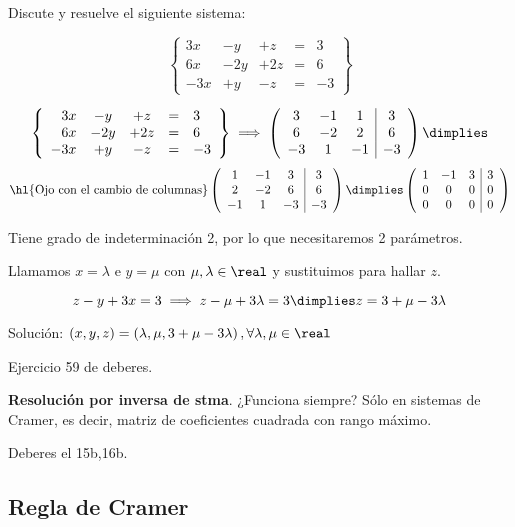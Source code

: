 \begin{problem}

Discute y resuelve el siguiente sistema:

\[
\left\{\begin{array}{rcccl}
3x&-y&+z&=&3\\
6x&-2y&+2z&=&6\\
-3x&+y&-z&=&-3
\end{array}\right\}
\]

\solution


\[
\left\{\begin{array}{rcccl}
3x&-y&+z&=&3\\
6x&-2y&+2z&=&6\\
-3x&+y&-z&=&-3
\end{array}\right\} \implies
\left(\begin{array}{ccc|c}
3&-1&1&3\\
6&-2&2&6\\
-3&1&-1&-3
\end{array}\right)
\dimplies\]
\[
\text{\hl{Ojo con el cambio de columnas}}
\left(\begin{array}{ccc|c}
1&-1&3&3\\
2&-2&6&6\\
-1&1&-3&-3
\end{array}\right)
\dimplies
\left(\begin{array}{ccc|c}
1&-1&3&3\\
0&0&0&0\\
0&0&0&0
\end{array}\right)
\]

Tiene grado de indeterminación 2, por lo que necesitaremos 2 parámetros.

Llamamos $x=\lambda$ e $y = \mu$ con $\mu,\lambda\in\real$ y sustituimos para hallar $z$.

$$z-y+3x=3 \implies z - \mu + 3\lambda = 3 \dimplies z = 3+\mu-3\lambda$$

Solución: $(x,y,z) = \left(\lambda, \mu, 3+\mu - 3\lambda\right), \forall\lambda,\mu\in\real$

\end{problem}

Ejercicio 59 de deberes.

\textbf{Resolución por inversa de stma}. ¿Funciona siempre? Sólo en sistemas de Cramer, es decir, matriz de coeficientes cuadrada con rango máximo. 

Deberes el 15b,16b.

\subsection{Regla de Cramer}

